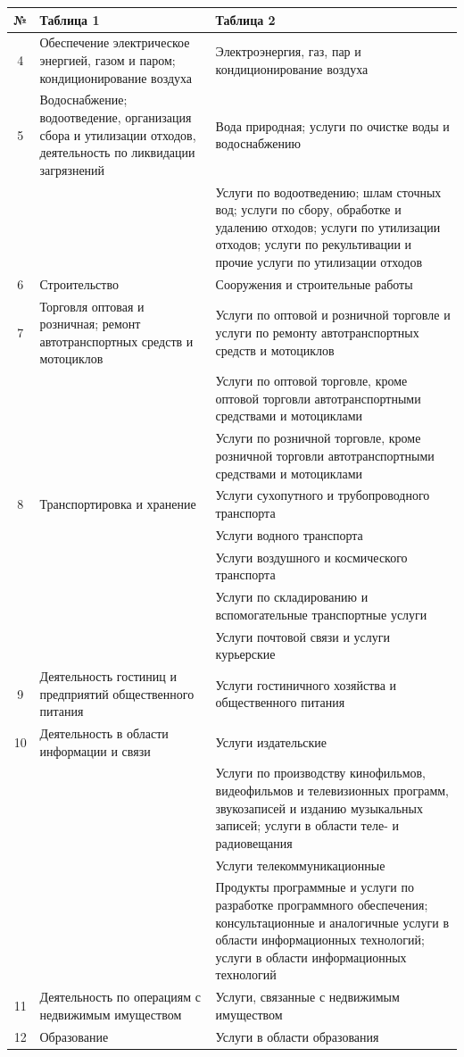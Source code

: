 \documentclass[12pt, a4paper]{article}
\begin{document}
\begin{tabular}[t]{|c|p{6cm}|p{9cm}|}
\hline
	№ & Таблица 1 & Таблица 2\\
\hline
4 & Обеспечение электрическое энергией, газом и паром; кондиционирование воздуха & Электроэнергия, газ, пар и кондиционирование воздуха\\ \cline{1-3}
5 & Водоснабжение; водоотведение, организация сбора и утилизации отходов, деятельность по ликвидации загрязнений & Вода природная; услуги по очистке воды и водоснабжению\\ \cline{3-3}
&& Услуги по водоотведению; шлам сточных вод; услуги по сбору, обработке и удалению отходов; услуги по утилизации отходов; услуги по рекультивации и прочие услуги по утилизации отходов \\ \cline{1-3}
6 & Строительство & Сооружения и строительные работы\\ \cline{1-3}
7 & Торговля оптовая и розничная; ремонт автотранспортных средств и мотоциклов & Услуги по оптовой и розничной торговле и услуги по ремонту автотранспортных средств и мотоциклов\\ \cline{3-3}
&& Услуги по оптовой торговле, кроме оптовой торговли автотранспортными средствами и мотоциклами \\ \cline{3-3}
&& Услуги по розничной торговле, кроме розничной торговли автотранспортными средствами и мотоциклами \\ \cline{1-3}
8 & Транспортировка и хранение & Услуги сухопутного и трубопроводного транспорта\\ \cline{3-3}
&& Услуги водного транспорта \\ \cline{3-3}
&&Услуги воздушного и космического транспорта\\ \cline{3-3}
&&Услуги по складированию и вспомогательные транспортные услуги \\ \cline{3-3}
&& Услуги почтовой связи и услуги курьерские\\ \cline{1-3}
9 & Деятельность гостиниц и предприятий общественного питания & Услуги гостиничного хозяйства и общественного питания\\ \cline{1-3}
10 & Деятельность в области информации и связи & Услуги издательские\\ \cline{3-3}
&& Услуги по производству кинофильмов, видеофильмов и телевизионных программ, звукозаписей и изданию музыкальных записей; услуги в области теле- и радиовещания \\ \cline{3-3}
&& Услуги телекоммуникационные \\ \cline{3-3}
&& Продукты программные и услуги по разработке программного обеспечения; консультационные и аналогичные услуги в области информационных технологий; услуги в области информационных технологий \\ \cline{1-3}
11 & Деятельность по операциям с недвижимым имуществом & Услуги, связанные с недвижимым имуществом \\ \cline{1-3}
12 & Образование & Услуги в области образования\\ \cline{1-3}
\end{tabular}
\end{document}
